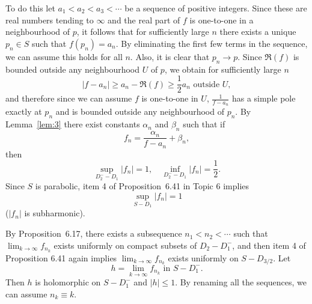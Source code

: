 \documentclass[a4paper,11pt]{article}
\begin{document}
\begin{mdframed}[skipbelow=1ex]
  To do this let $a_1 < a_2 < a_3 < \cdots$ be a sequence of positive
  integers.  Since these are real numbers tending to $\infty$ and the
  real part of $f$ is one-to-one in a neighbourhood of $p$, it follows
  that for sufficiently large $n$ there exists a unique $p_n \in S$
  such that $f(p_n) = a_n$.  By eliminating the first few terms in the
  sequence, we can assume this holds for all $n$.  Also, it is clear
  that $p_n \to p$.  Since $\Re(f)$ is bounded outside any
  neighbourhood $U$ of $p$, we obtain for sufficiently large $n$
  $$
  |f-a_n| \ge a_n - \Re(f) \ge \frac{1}{2}a_n
  \text{ outside } U,
  $$
  and therefore since we can assume $f$ is one-to-one in $U$,
  $\frac{1}{f-a_n}$ has a simple pole exactly at $p_n$ and is bounded
  outside any neighbourhood of $p_n$.  By Lemma~\ref{lem:3} there
  exist constants $\alpha_n$ and $\beta_n$ such that if
  $$
  f_n = \frac{\alpha_n}{f-a_n} + \beta_n,
  $$
  then
  $$
  \sup_{D_2^- - D_1} |f_n| = 1,\quad
  \inf_{D_2^- - D_1} |f_n| = \frac{1}{2}.
  $$
  Since $S$ is parabolic, item 4 of Proposition~6.41 in Topic 6
  implies
  $$
  \sup_{S-D_1} |f_n| = 1
  $$
  ($|f_n|$ is subharmonic).

  By Proposition~6.17, there exists a subsequence $n_1 < n_2 < \cdots$
  such that $\lim_{k\to\infty} f_{n_k}$ exists uniformly on compact
  subsets of $D_2 - D_1^-$, and then item 4 of Proposition 6.41 again
  implies $\lim_{k\to\infty} f_{n_k}$ exists uniformly on $S -
  D_{3/2}$.  Let
  $$
  h = \lim_{k\to\infty} f_{n_k} \text{ in } S - D_1^-.
  $$
  Then $h$ is holomorphic on $S-D_1^-$ and $|h| \le 1$.  By renaming
  all the sequences, we can assume $n_k \equiv k$.


\end{mdframed}
\end{document}

